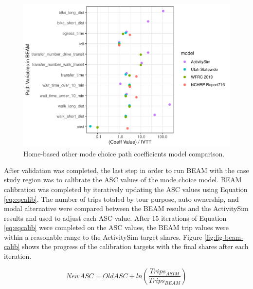 \documentclass[fancy, masters]{byuthesis}
\begin{document}
\begin{figure}

{\centering \includegraphics{thesis_files/figure-latex/hbo-1} 

}

\caption{Home-based other mode choice path coefficients model comparison.}\label{fig:hbo}
\end{figure}

After validation was completed, the last step in order to run BEAM with the case study region was to calibrate the ASC values of the mode choice model. BEAM calibration was completed by iteratively updating the ASC values using Equation \eqref{eq:eqcalib}. The number of trips totaled by tour purpose, auto ownership, and modal alternative were compared between the BEAM results and the ActivitySim results and used to adjust each ASC value. After 15 iterations of Equation \eqref{eq:eqcalib} were completed on the ASC values, the BEAM trip values were within a reasonable range to the ActivitySim target shares. Figure \ref{fig:fig-beam-calib} shows the progress of the calibration targets with the final shares after each iteration.

\begin{equation}
  NewASC = OldASC + ln(\frac{Trips_{ASIM}}{Trips_{BEAM}}) \label{eq:eqcalib}
\end{equation}
\end{document}
